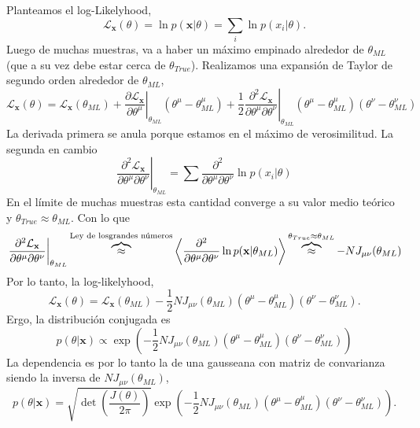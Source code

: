 Planteamos el log-Likelyhood,
\begin{equation}
    \mathcal{L}_\mathbf{x}(\theta) = \ln p(\mathbf{x}|\theta)= \sum_i \ln p(x_i|\theta).
\end{equation}
Luego de muchas muestras, va a haber un m\'aximo empinado alrededor de $\theta_{ML}$ (que a su vez debe estar cerca de $\theta_{True}$). Realizamos una expansi\'on de Taylor de segundo orden alrededor de $\theta_{ML}$,
\begin{equation}
    \mathcal{L}_\mathbf{x}(\theta) = \mathcal{L}_\mathbf{x}(\theta_{ML}) + \left.\frac{\partial \mathcal{L}_\mathbf{x}}{\partial \theta^\mu}\right|_{\theta_{ML}}(\theta^\mu- \theta^\mu_{ML})
    + \frac{1}{2}\left.\frac{\partial^2 \mathcal{L}_\mathbf{x}}{\partial \theta^\mu\partial \theta^\nu}\right|_{\theta_{ML}}(\theta^\mu- \theta^\mu_{ML})(\theta^\nu- \theta^\nu_{ML})
\end{equation}
La derivada primera se anula porque estamos en el m\'aximo de verosimilitud. La segunda en cambio
\begin{equation}
    \left.\frac{\partial^2 \mathcal{L}_\mathbf{x}}{\partial \theta^\mu\partial \theta^\nu}\right|_{\theta_{ML}} =
    \sum \frac{\partial^2}{\partial \theta^\mu\partial\theta^\nu}\ln p(x_i|\theta)
\end{equation}
En el l\'imite de muchas muestras esta cantidad converge a su valor medio te\'orico y $\theta_{True}\approx \theta_{ML}$. Con lo que
\begin{equation}
    \left.\frac{\partial^2 \mathcal{L}_\mathbf{x}}{\partial \theta^\mu\partial \theta^\nu}\right|_{\theta_{ML}} \overbrace{\approx}^{\text{Ley de los \\ grandes n\'umeros}}
    \left\langle \frac{\partial^2}{\partial \theta^\mu\partial\theta^\nu}\ln p(\mathbf{x}|\theta_{ML})\right\rangle
    \overbrace{\approx}^{\theta_{True}\approx\theta_{ML}} -N J_{\mu\nu}(\theta_{ML})
\end{equation}
Por lo tanto, la log-likelyhood,
\begin{equation}
    \mathcal{L}_\mathbf{x}(\theta) = \mathcal{L}_\mathbf{x}(\theta_{ML}) 
    - \frac{1}{2}NJ_{\mu\nu}(\theta_{ML})(\theta^\mu- \theta^\mu_{ML})(\theta^\nu- \theta^\nu_{ML}).
\end{equation}
Ergo, la distribuci\'on conjugada es 
\begin{equation}
    p(\theta|\mathbf{x}) \propto \exp\left(- \frac{1}{2}NJ_{\mu\nu}(\theta_{ML})(\theta^\mu- \theta^\mu_{ML})(\theta^\nu- \theta^\nu_{ML})\right)
\end{equation}
La dependencia es por lo tanto la de una gausseana con matriz de convarianza siendo la inversa de $NJ_{\mu\nu}(\theta_{ML})$,
\begin{equation}
    p(\theta|\mathbf{x}) = \sqrt{\det\left( \frac{J(\theta)}{2\pi}  \right)} \exp\left(- \frac{1}{2}NJ_{\mu\nu}(\theta_{ML})(\theta^\mu- \theta^\mu_{ML})(\theta^\nu- \theta^\nu_{ML})\right).
\end{equation}

